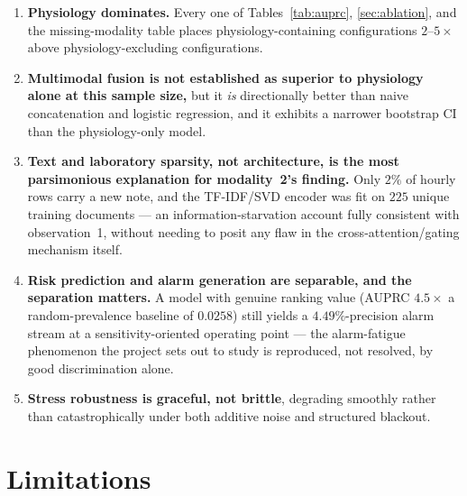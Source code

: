 \documentclass[11pt]{article}
\newcommand{\1}[1]{\mathbf{1}\!\left[#1\right]}
\begin{document}
\begin{enumerate}
\item \textbf{Physiology dominates.} Every one of Tables~\ref{tab:auprc}, \ref{sec:ablation}, and the missing-modality table places physiology-containing configurations $2$--$5\times$ above physiology-excluding configurations.
\item \textbf{Multimodal fusion is not established as superior to physiology alone at this sample size,} but it \emph{is} directionally better than naive concatenation and logistic regression, and it exhibits a narrower bootstrap CI than the physiology-only model.
\item \textbf{Text and laboratory sparsity, not architecture, is the most parsimonious explanation for modality~2's finding.} Only $2\%$ of hourly rows carry a new note, and the TF-IDF/SVD encoder was fit on $225$ unique training documents — an information-starvation account fully consistent with observation~1, without needing to posit any flaw in the cross-attention/gating mechanism itself.
\item \textbf{Risk prediction and alarm generation are separable, and the separation matters.} A model with genuine ranking value (AUPRC $4.5\times$ a random-prevalence baseline of $0.0258$) still yields a $4.49\%$-precision alarm stream at a sensitivity-oriented operating point — the alarm-fatigue phenomenon the project sets out to study is reproduced, not resolved, by good discrimination alone.
\item \textbf{Stress robustness is graceful, not brittle}, degrading smoothly rather than catastrophically under both additive noise and structured blackout.
\end{enumerate}

\section{Limitations}
\end{document}
